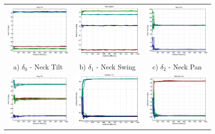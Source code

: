 \begin{figure}
\centering
\begin{tabular}{ccc}
 \includegraphics[width=0.32\linewidth]{images/results/neck_tilt_offsets} &  
 \includegraphics[width=0.32\linewidth]{images/results/neck_swing_offsets} &
 \includegraphics[width=0.32\linewidth]{images/results/neck_pan_offsets} \\
  a) $\delta_0$ - Neck Tilt & b) $\delta_1$ - Neck Swing & c) $\delta_2$ - Neck Pan \\
 \includegraphics[width=0.32\linewidth]{images/results/eyes_tilt_offsets} &
 \includegraphics[width=0.32\linewidth]{images/results/left_eye_pan_offsets} & 
 \includegraphics[width=0.32\linewidth]{images/results/right_eye_pan_offsets}\\

\end{tabular}
\end{figure}
